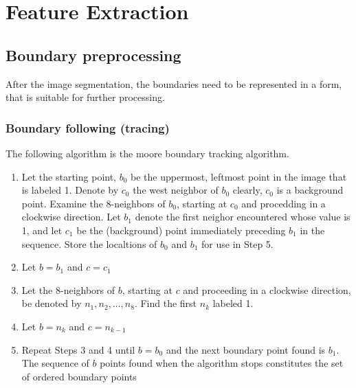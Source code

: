\section{Feature Extraction}
\label{sec:featureExtraction}
\subsection{Boundary preprocessing}
After the image segmentation, the boundaries need to be represented in a form, that is suitable for further processing.
\subsubsection{Boundary following (tracing)}
The following algorithm is the moore boundary tracking algorithm.
\begin{enumerate}
\item Let the starting point, $b_0$ be the uppermost, leftmost point in the image that is labeled 1. Denote by $c_0$ the west neighbor of $b_0$ clearly, $c_0$ is a background point. Examine the 8-neighbors of $b_0$, starting at $c_0$ and procedding in a clockwise direction. Let $b_1$ denote the first neighor encountered whose value is 1, and let $c_1$ be the (background) point immediately preceding $b_1$ in the sequence. Store the localtions of $b_0$ and $b_1$ for use in Step 5.
\item Let $b=b_1$ and $c=c_1$
\item Let the 8-neighbors of $b$, starting at $c$ and proceeding in a clockwise direction, be denoted by $n_1,n_2,\ldots,n_8$. Find the first $n_k$ labeled 1.
\item Let $b=n_k$ and $c=n_{k-1}$
\item Repeat Steps 3 and 4 until $b=b_0$ and the next boundary point found is $b_1$. The sequence of $b$ points found when the algorithm stops constitutes the set of ordered boundary points
\end{enumerate}
